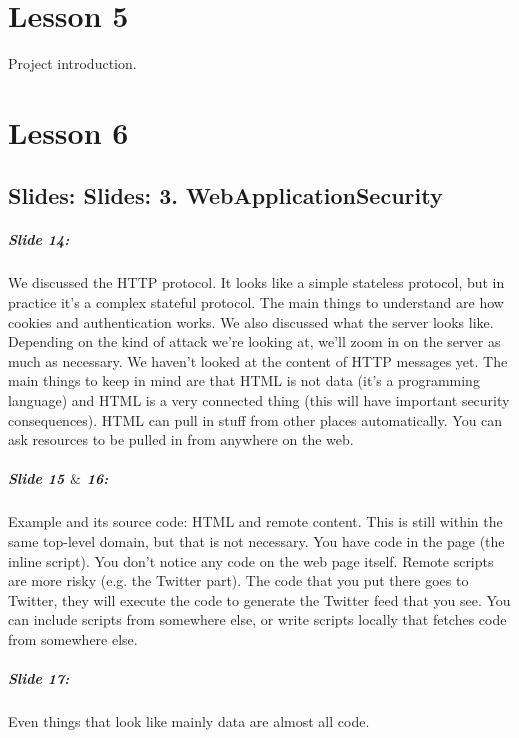 \documentclass[10pt,a4paper]{report}
\begin{document}
\chapter{Lesson 5}
Project introduction.

\chapter{Lesson 6}
\section{Slides: Slides: 3. WebApplicationSecurity}

\paragraph{Slide 14:} We discussed the HTTP protocol. It looks like a simple stateless protocol, but in practice it's a complex stateful protocol. The main things to understand are how cookies and authentication works. We also discussed what the server looks like. Depending on the kind of attack we're looking at, we'll zoom in on the server as much as necessary. We haven't looked at the content of HTTP messages yet. The main things to keep in mind are that HTML is not data (it's a programming language) and HTML is a very connected thing (this will have important security consequences). HTML can pull in stuff from other places automatically. You can ask resources to be pulled in from anywhere on the web. 

\paragraph{Slide 15 $\&$ 16:} Example and its source code: HTML and remote content. This is still within the same top-level domain, but that is not necessary. You have code in the page (the inline script). You don't notice any code on the web page itself. Remote scripts are more risky (e.g. the Twitter part). The code that you put there goes to Twitter, they will execute the code to generate the Twitter feed that you see. You can include scripts from somewhere else, or write scripts locally that fetches code from somewhere else. 

\paragraph{Slide 17:} Even things that look like mainly data are almost all code. 
\end{document}
